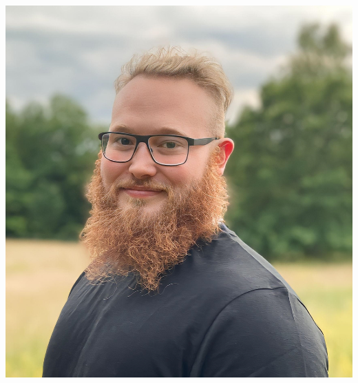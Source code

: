 \documentclass{article}
\begin{document}
	\begin{minipage}[t]{0.28\textwidth}
		\begin{minipage}[t]{0.8\textwidth}
			\vspace{-10pt} %
			\includegraphics[width=\linewidth]{me.png}
			\label{fig:image}
		\end{minipage}
		
	\end{minipage}
	
\end{document}
